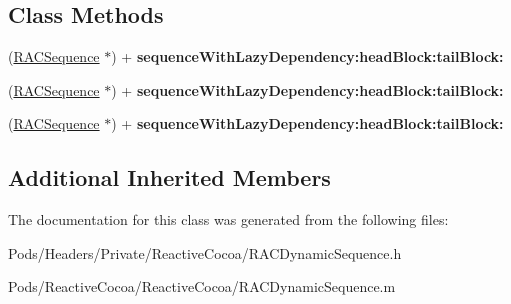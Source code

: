 \subsection*{Class Methods}
\begin{DoxyCompactItemize}
\item 
\mbox{\label{interface_r_a_c_dynamic_sequence_a15243e036ad0d068c8e9399342e9a5f0}} 
(\mbox{\hyperlink{interface_r_a_c_sequence}{R\+A\+C\+Sequence}} $\ast$) + {\bfseries sequence\+With\+Lazy\+Dependency\+:head\+Block\+:tail\+Block\+:}
\item 
\mbox{\label{interface_r_a_c_dynamic_sequence_a15243e036ad0d068c8e9399342e9a5f0}} 
(\mbox{\hyperlink{interface_r_a_c_sequence}{R\+A\+C\+Sequence}} $\ast$) + {\bfseries sequence\+With\+Lazy\+Dependency\+:head\+Block\+:tail\+Block\+:}
\item 
\mbox{\label{interface_r_a_c_dynamic_sequence_a15243e036ad0d068c8e9399342e9a5f0}} 
(\mbox{\hyperlink{interface_r_a_c_sequence}{R\+A\+C\+Sequence}} $\ast$) + {\bfseries sequence\+With\+Lazy\+Dependency\+:head\+Block\+:tail\+Block\+:}
\end{DoxyCompactItemize}
\subsection*{Additional Inherited Members}


The documentation for this class was generated from the following files\+:\begin{DoxyCompactItemize}
\item 
Pods/\+Headers/\+Private/\+Reactive\+Cocoa/R\+A\+C\+Dynamic\+Sequence.\+h\item 
Pods/\+Reactive\+Cocoa/\+Reactive\+Cocoa/R\+A\+C\+Dynamic\+Sequence.\+m\end{DoxyCompactItemize}
